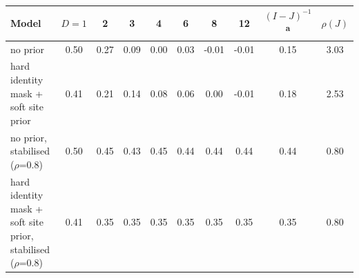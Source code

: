 \begin{tabular}{p{4.2cm}ccccccccc}
\toprule
Model & $D{=}1$ & 2 & 3 & 4 & 6 & 8 & 12 & $(I-J)^{-1}$\textsuperscript{a} & $\rho(J)$ \\
\midrule
no prior & 0.50 & 0.27 & 0.09 & 0.00 & 0.03 & -0.01 & -0.01 & 0.15 & 3.03 \\
hard identity mask + soft site prior & 0.41 & 0.21 & 0.14 & 0.08 & 0.06 & 0.00 & -0.01 & 0.18 & 2.53 \\
no prior, stabilised ($\rho$=0.8) & 0.50 & 0.45 & 0.43 & 0.45 & 0.44 & 0.44 & 0.44 & 0.44 & 0.80 \\
hard identity mask + soft site prior, stabilised ($\rho$=0.8) & 0.41 & 0.35 & 0.35 & 0.35 & 0.35 & 0.35 & 0.35 & 0.35 & 0.80 \\
\bottomrule
\end{tabular}